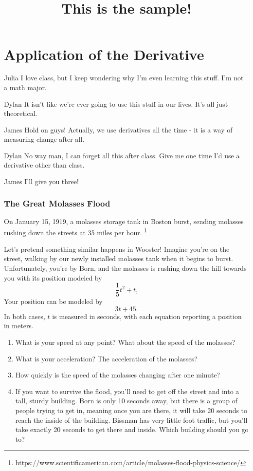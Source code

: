 \documentclass{ximera}
\begin{document}
\title{This is the sample!}
\section{Application of the Derivative}
\begin{dialogue}
\item[Julia] I love class, but I keep wondering why I'm even learning this stuff. I'm not a math major.
\item[Dylan] It isn't like we're ever going to use this stuff in our lives. It's all just theoretical.
\item[James] Hold on guys! Actually, we use derivatives all the time - it is a way of measuring change after all.
\item[Dylan] No way man, I can forget all this after class. Give me one time I'd use a derivative other than class.
\item[James] I'll give you three!
\end{dialogue}
\subsubsection{The Great Molasses Flood}
On January 15, 1919, a molasses storage tank in Boston burst, sending molasses rushing down the streets at 35 miles per hour. \footnote{https://www.scientificamerican.com/article/molasses-flood-physics-science/}

Let's pretend something similar happens in Wooster! Imagine you're on the street, walking by our newly installed molasses tank when it begins to burst. Unfortunately, you're by Born, and the molasses is rushing down the hill towards you with its position modeled by $$\frac{1}{5}t^2+t \text{,}$$ Your position can be modeled by $$3t+45 \text{.}$$ In both cases, $t$ is measured in seconds, with each equation reporting a position in meters.

\begin{enumerate}
\item{What is your speed at any point? What about the speed of the molasses?}
\item{What is your acceleration? The acceleration of the molasses?}
\item{How quickly is the speed of the molasses changing after one minute?}
\item{If you want to survive the flood, you'll need to get off the street and into a tall, sturdy building. Born is only 10 seconds away, but there is a group of people trying to get in, meaning once you are there, it will take 20 seconds to reach the inside of the building. Bissman has very little foot traffic, but you'll take exactly 20 seconds to get there and inside. Which building should you go to?}
\end{enumerate}
\end{document}
